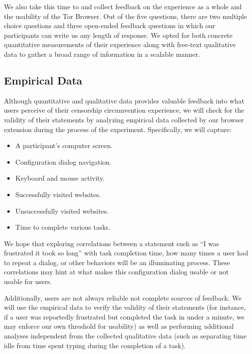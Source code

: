 \documentclass[letterpaper,twocolumn,11pt]{article}
\begin{document}
We also take this time to and collect feedback on the experience as a whole and the usability of 
the Tor Browser. Out of the five questions, there are two multiple choice questions and three 
open-ended feedback questions in which our participants can write us any length of response. 
We opted for both concrete quantitative measurements of their experience along with free-text
qualitative data to gather a broad range of information in a scalable manner. 

\subsection{Empirical Data} 
Although quantitative and qualitative data provides valuable feedback into what users perceive of 
their censorship circumvention experience, we will check for the validity of their 
statements by analyzing empirical data collected by our browser extension during the process of the
experiment. Specifically, we will capture: 

\begin{itemize} \itemsep1pt \parskip0pt 
\item A participant's computer screen. 
\item Configuration dialog navigation. 
\item Keyboard and mouse activity.
\item Successfully visited websites. 
\item Unsuccessfully visited websites. 
\item Time to complete various tasks.
\end{itemize}

We hope that exploring correlations between a statement such as  ``I was frustrated it took so long'' 
with task completion time, how many times a user had to repeat a dialog, or other behaviors 
will be an illuminating process. These correlations may hint at what makes this configuration dialog 
usable or not usable for users. 

Additionally, users are not always reliable not complete sources of feedback. We will use the 
empirical data to verify the validity of their statements (for instance, if a user was reportedly frustrated 
but completed the task in under a minute, we may enforce our own threshold for usability) as well as 
performing additional analyses independent from the collected qualitative data (such as separating time
idle from time spent typing during the completion of a task).
\end{document}
